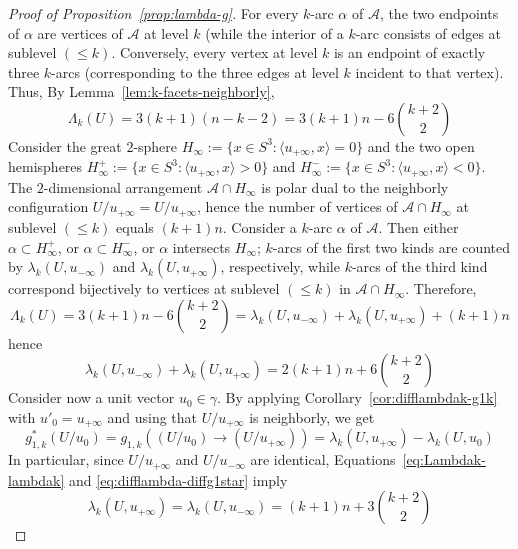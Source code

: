 \begin{proof}[Proof of Proposition~\ref{prop:lambda-g}]
For every $k$-arc $\alpha$ of  $\mathcal{A}$, the two endpoints of $\alpha$ are vertices of $\mathcal{A}$ at level $k$ (while the interior of a $k$-arc consists of edges at sublevel $(\leq k)$. Conversely, every vertex at level $k$ is an endpoint of exactly three $k$-arcs (corresponding to the three edges at level $k$ incident to that vertex). Thus, By Lemma~\ref{lem:k-facets-neighborly},
\begin{equation}
\label{eq:Lambdak}
\Lambda_k(U)=3(k+1)(n-k-2)=3(k+1)n-6\binom{k+2}{2}
\end{equation}
Consider the great $2$-sphere $H_{\infty}:=\{x\in S^3\colon \langle u_{+\infty},x\rangle =0\}$ and the two open hemispheres $H^+_{\infty}:=\{x\in S^3\colon \langle u_{+\infty},x\rangle > 0\}$
and $H^-_{\infty}:=\{x\in S^3\colon \langle u_{+\infty},x\rangle < 0\}$. The $2$-dimensional arrangement $\mathcal{A}\cap H_{\infty}$ is polar dual to the neighborly configuration $U/u_{+\infty}=U/u_{+\infty}$, hence the number of vertices of $\mathcal{A}\cap H_{\infty}$ at sublevel $(\leq k)$ equals $(k+1)n$.
%
Consider a $k$-arc $\alpha$ of $\mathcal{A}$. Then either $\alpha \subset H^+_{\infty}$, or $\alpha \subset H^-_{\infty}$, or $\alpha$ intersects $H_\infty$; $k$-arcs of the first two kinds are counted by $\lambda_k(U,u_{-\infty})$ and $\lambda_k(U,u_{+\infty})$, respectively, while $k$-arcs of the third kind correspond bijectively to vertices at sublevel $(\leq k)$ in $\mathcal{A}\cap H_{\infty}$. Therefore,
\[
\Lambda_k(U)=3(k+1)n-6\binom{k+2}{2}=\lambda_k(U,u_{-\infty}) + \lambda_k(U,u_{+\infty}) +(k+1)n
\]
hence
\begin{equation}
\label{eq:Lambdak-lambdak}
\lambda_k(U,u_{-\infty}) + \lambda_k(U,u_{+\infty}) = 2(k+1)n + 6\binom{k+2}{2}
\end{equation}
Consider now a unit vector $u_0 \in \gamma$. By applying Corollary~\ref{cor:difflambdak-g1k} with $u'_0 =u_{+\infty}$ and using that $U/u_{+\infty}$ is neighborly, we get
\begin{equation}
\label{eq:difflambda-diffg1star}
g^*_{1,k}(U/u_0) = g_{1,k}((U/u_0) \to (U/u_{+\infty}))
= \lambda_k(U,u_{+\infty}) - \lambda_k(U,u_0)
\end{equation}
In particular, since $U/u_{+\infty}$ and $U/u_{-\infty}$ are identical, Equations~\eqref{eq:Lambdak-lambdak} and \eqref{eq:difflambda-diffg1star}  imply
\begin{equation}
\label{eq:lambdapminfty}
\lambda_k(U,u_{+\infty}) = \lambda_k(U,u_{-\infty}) = (k+1)n + 3\binom{k+2}{2}

\end{equation}
\end{proof}
